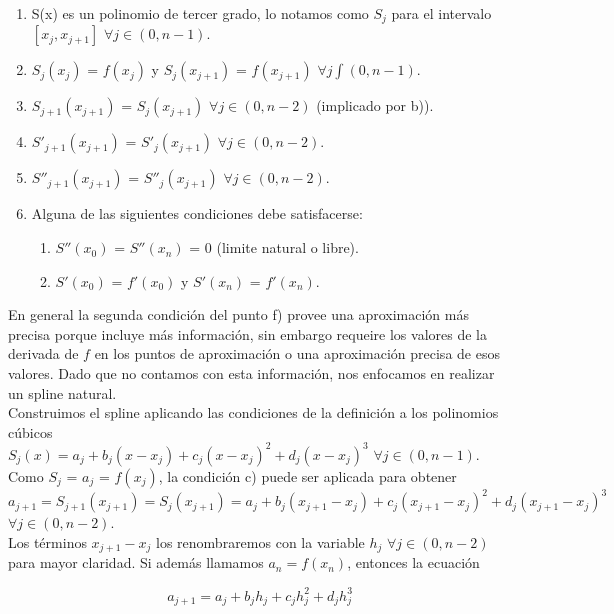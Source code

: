 \begin{enumerate}
\item  S(x) es un polinomio de tercer grado, lo notamos como $S_{j}$ para el intervalo $[x_{j},x_{j+1}]$ $\forall j \in (0, n-1)$.
\item $S_{j}(x_{j})$ = $f(x_{j})$  y $S_{j}(x_{j+1})$ = $f(x_{j+1})$ $\forall j \int (0, n-1)$.
\item $S_{j+1}(x_{j+1})$ = $S_{j}(x_{j+1})$ $\forall j \in (0, n-2)$ (implicado por b)).
\item $S'_{j+1}(x_{j+1})$ = $S'_{j}(x_{j+1})$ $\forall j \in (0, n-2)$.
\item $S''_{j+1}(x_{j+1})$ = $S''_{j}(x_{j+1})$ $\forall j \in (0, n-2)$.
\item Alguna de las siguientes condiciones debe satisfacerse:
  \begin{enumerate}
  \item $S''(x_{0})$ = $S''(x_{n})$ = 0 (limite natural o libre).
  \item $S'(x_{0})$ = $f'(x_{0})$ y $S'(x_{n})$ = $f'(x_{n})$.
  \end{enumerate}
\end{enumerate}

En general la segunda condición del punto f) provee una aproximación más precisa porque incluye más información, sin embargo requeire los valores de la derivada de $f$ en los puntos de aproximación o una aproximación precisa de esos valores. Dado que no contamos con esta información, nos enfocamos en realizar un spline natural.\\


Construimos el spline aplicando las condiciones de la definición a los polinomios cúbicos\\ $S_{j}(x) = a_{j} + b_{j} (x - x_{j}) + c_{j} (x - x_{j})^{2} + d_{j} (x - x_{j})^{3}$ $\forall j \in (0, n-1)$.\\

Como $S_{j}$ = $a_{j}$ = $f(x_{j})$, la condición c) puede ser aplicada para obtener $ a_{j+1} = S_{j+1}(x_{j+1}) = S_{j}(x_{j+1}) = a_{j} + b_{j} (x_{j+1} - x_{j}) + c_{j} (x_{j+1} - x_{j})^{2} + d_{j} (x_{j+1} - x_{j})^{3}$ $\forall j \in (0, n-2)$.\\

Los términos $ x_{j+1} - x_{j} $ los renombraremos con la variable $h_{j}$ $\forall j \in (0, n-2)$ para mayor claridad. Si además llamamos $a_{n} = f(x_{n})$, entonces la ecuación

\begin{equation} \label{eq:ecuacion3.15}
a_{j+1} = a_{j} + b_{j} h_{j} + c_{j} h_{j}^{2} + d_{j} h_{j}^{3} 
\end{equation}

